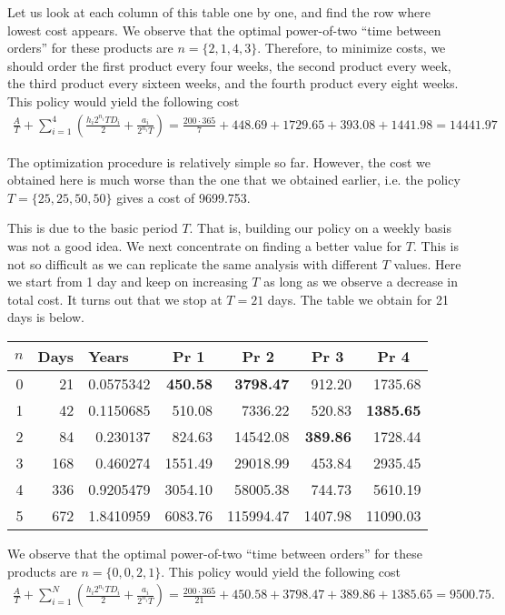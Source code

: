 \begin{exercise}
\begin{solution}
Let us look at each column of this table one by one, and find the row where lowest cost appears. We observe that the optimal power-of-two ``time between orders'' for these products are $n=\{2,1,4,3\}$. Therefore, to minimize costs, we should order the first product every four weeks, the second product every week, the third product every sixteen weeks, and the fourth product every eight weeks. This policy would yield the following cost
\begin{align*}
\frac{A}{T} + \sum_{i=1}^4 \left(\frac{h_i 2^{n_i} T D_i}{2} + \frac{a_i}{2^{n_i} T}\right) 
= \frac{200\cdot 365}{7} + 448.69 + 1729.65 + 393.08 + 1441.98 = 14441.97
\end{align*}

The optimization procedure is relatively simple so far. However, the cost we obtained here is much worse than the one that we obtained earlier, i.e. the policy $T=\{25,25,50,50\}$ gives a cost of 9699.753. 

This is due to the basic period $T$. That is, building our policy on a weekly basis was not a good idea. We next concentrate on finding a better value for $T$. This is not so difficult as we can replicate the same analysis with different $T$ values. Here we start from 1 day and keep on increasing $T$ as long as we observe a decrease in total cost. It turns out that we stop at $T=21$ days. The table we obtain for 21 days is below. 

\begin{center}
    \begin{tabular}{rrr|rrrr}
    \multicolumn{1}{c}{$n$} & \multicolumn{1}{c}{Days} & \multicolumn{1}{l}{Years} & \multicolumn{1}{c}{Pr 1} & \multicolumn{1}{c}{Pr 2} & \multicolumn{1}{c}{Pr 3} & \multicolumn{1}{c}{Pr 4} \\
    \toprule
    0     & 21    & 0.0575342 & \textbf{450.58} & \textbf{3798.47} & 912.20 & 1735.68 \\
    1     & 42    & 0.1150685 & 510.08 & 7336.22 & 520.83 & \textbf{1385.65} \\
    2     & 84    & 0.230137 & 824.63 & 14542.08 & \textbf{389.86} & 1728.44 \\
    3     & 168   & 0.460274 & 1551.49 & 29018.99 & 453.84 & 2935.45 \\
    4     & 336   & 0.9205479 & 3054.10 & 58005.38 & 744.73 & 5610.19 \\
    5     & 672   & 1.8410959 & 6083.76 & 115994.47 & 1407.98 & 11090.03 \\
    \bottomrule
    \end{tabular}
\end{center}

 We observe that the optimal power-of-two ``time between orders'' for these products are $n=\{0,0,2,1\}$. This policy would yield the following cost
 \begin{align*}
\frac{A}{T} + \sum_{i=1}^N \left(\frac{h_i 2^{n_i} T D_i}{2} + \frac{a_i}{2^{n_i} T}\right) 
= \frac{200\cdot 365}{21} + 450.58 + 3798.47 + 389.86 + 1385.65 = 9500.75.
\end{align*}
\end{solution}
\end{exercise}
